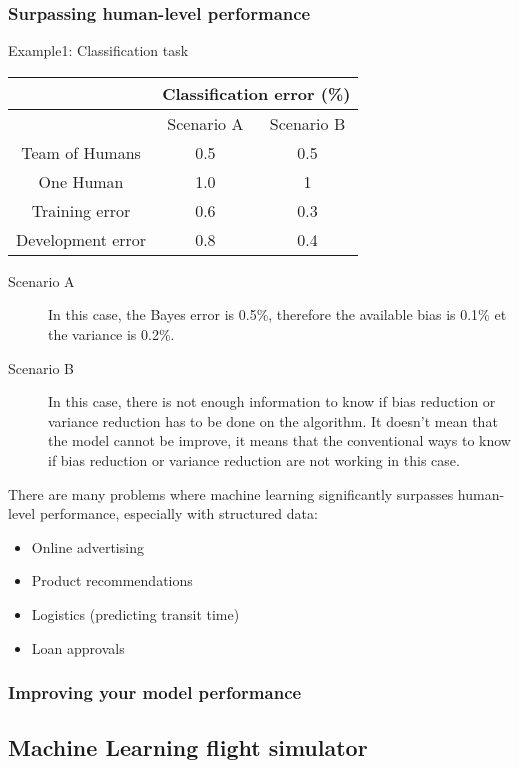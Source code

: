 \subsubsection{Surpassing human-level performance} Example1: Classification task
\begin{center}
\begin{tabular}{ |c|c|c| } 
 \hline
  & \multicolumn{2}{c}{Classification error (\%)} \\ 
 \hline
  & Scenario A & Scenario B \\ 
 \hline
 Team of Humans & 0.5 & 0.5 \\
 \hline
 One Human & 1.0 & 1 \\
 \hline
 Training error & 0.6 & 0.3 \\ 
 \hline
 Development error & 0.8 & 0.4 \\
 \hline
\end{tabular}
\end{center}
\begin{description}
  \item[Scenario A] In this case, the Bayes error is 0.5\%, therefore the available bias is 0.1\% et the variance is 0.2\%. 
  \item[Scenario B] In this case, there is not enough information to know if bias reduction or variance reduction has to be done on the algorithm. It doesn’t mean that the model cannot be improve, it means that the conventional ways to know if bias reduction or variance reduction are not working in this case.
\end{description}
There are many problems where machine learning significantly surpasses human-level performance, especially with structured data:
\begin{itemize}
    \item Online advertising
    \item Product recommendations
    \item Logistics (predicting transit time)
    \item Loan approvals
\end{itemize}

\subsubsection{Improving your model performance}

\subsection{Machine Learning flight simulator}

